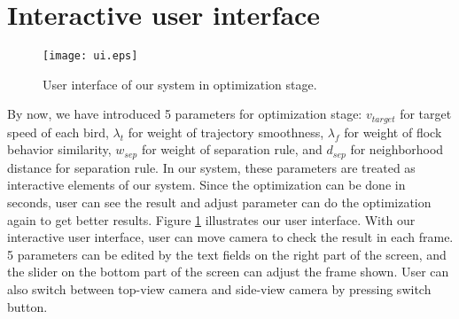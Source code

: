 \section{Interactive user interface}


\begin{figure}[h]
 \begin{center}
  \texttt{[image: ui.eps]}
 \end{center}
 \caption{User interface of our system in optimization stage.}
 \label{figure:ui}
\end{figure}


By now, we have introduced 5 parameters for optimization stage: $v_{target}$ for target speed of each bird, $\lambda_{t}$ for weight of trajectory smoothness, $\lambda_{f}$ for weight of flock behavior similarity, $w_{sep}$ for weight of separation rule, and $d_{sep}$ for neighborhood distance for separation rule. In our system, these parameters are treated as interactive elements of our system. Since the optimization can be done in seconds, user can see the result and adjust parameter can do the optimization again to get better results. Figure \ref{figure:ui} illustrates our user interface. With our interactive user interface, user can move camera to check the result in each frame. 5 parameters can be edited by the text fields on the right part of the screen, and the slider on the bottom part of the screen can adjust the frame shown. User can also switch between top-view camera and side-view camera by pressing switch button.
